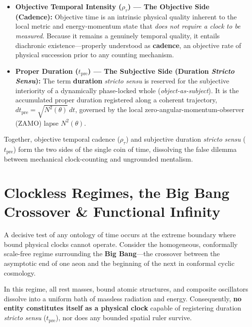 \documentclass[11pt,a4paper]{article}
\begin{document}
\begin{itemize}
    \item \textbf{Objective Temporal Intensity ($\rho_\tau$) --- The Objective Side (Cadence):} Objective time is an intrinsic physical quality inherent to the local metric and energy-momentum state that \emph{does not require a clock to be measured}. Because it remains a genuinely temporal quality, it entails diachronic existence---properly understood as \textbf{cadence}, an objective rate of physical succession prior to any counting mechanism.
    \item \textbf{Proper Duration ($t_{\mathrm{pre}}$) --- The Subjective Side (Duration \emph{Stricto Sensu}):} The term \textbf{duration} \emph{stricto sensu} is reserved for the subjective interiority of a dynamically phase-locked whole (\emph{object-as-subject}). It is the accumulated proper duration registered along a coherent trajectory, $dt_{\mathrm{pre}} = \sqrt{N^2(\theta)}\,dt$, governed by the local zero-angular-momentum-observer (ZAMO) lapse $N^2(\theta)$.
\end{itemize}

Together, objective temporal cadence ($\rho_\tau$) and subjective duration \emph{stricto sensu} ($t_{\mathrm{pre}}$) form the two sides of the single coin of time, dissolving the false dilemma between mechanical clock-counting and ungrounded mentalism.

\section{Clockless Regimes, the Big Bang Crossover \& Functional Infinity}

A decisive test of any ontology of time occurs at the extreme boundary where bound physical clocks cannot operate. Consider the homogeneous, conformally scale-free regime surrounding the \textbf{Big Bang}---the crossover between the asymptotic end of one aeon and the beginning of the next in conformal cyclic cosmology.

In this regime, all rest masses, bound atomic structures, and composite oscillators dissolve into a uniform bath of massless radiation and energy. Consequently, \textbf{no entity constitutes itself as a physical clock} capable of registering duration \emph{stricto sensu} ($t_{\mathrm{pre}}$), nor does any bounded spatial ruler survive.
\end{document}
